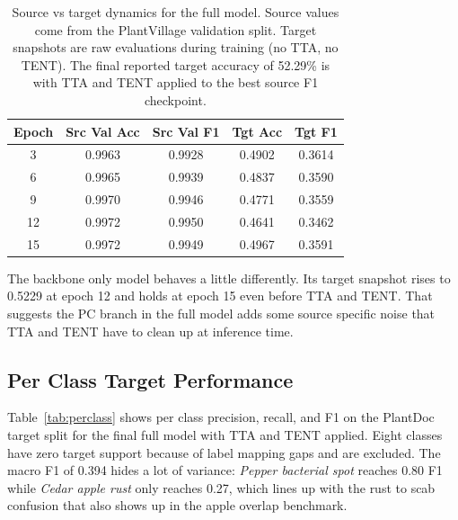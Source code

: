 \documentclass[conference]{IEEEtran}
\begin{document}
\begin{table}[ht]
\caption{Source vs target dynamics for the full model. Source values come from the PlantVillage validation split. Target snapshots are raw evaluations during training (no TTA, no TENT). The final reported target accuracy of 52.29\% is with TTA and TENT applied to the best source F1 checkpoint.}
\label{tab:dynamics}
\centering
\begin{tabular}{ccccc}
\toprule
Epoch & Src Val Acc & Src Val F1 & Tgt Acc & Tgt F1 \\
\midrule
3  & 0.9963 & 0.9928 & 0.4902 & 0.3614 \\
6  & 0.9965 & 0.9939 & 0.4837 & 0.3590 \\
9  & 0.9970 & 0.9946 & 0.4771 & 0.3559 \\
12 & 0.9972 & 0.9950 & 0.4641 & 0.3462 \\
15 & 0.9972 & 0.9949 & 0.4967 & 0.3591 \\
\bottomrule
\end{tabular}
\end{table}

The backbone only model behaves a little differently. Its target snapshot rises to 0.5229 at epoch 12 and holds at epoch 15 even before TTA and TENT. That suggests the PC branch in the full model adds some source specific noise that TTA and TENT have to clean up at inference time.

\subsection{Per Class Target Performance}

Table~\ref{tab:perclass} shows per class precision, recall, and F1 on the PlantDoc target split for the final full model with TTA and TENT applied. Eight classes have zero target support because of label mapping gaps and are excluded. The macro F1 of 0.394 hides a lot of variance: \textit{Pepper bacterial spot} reaches 0.80 F1 while \textit{Cedar apple rust} only reaches 0.27, which lines up with the rust to scab confusion that also shows up in the apple overlap benchmark.
\end{document}
